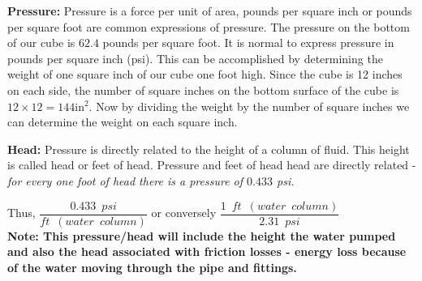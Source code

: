\textbf{Pressure:}  Pressure is a force per unit of area, pounds per square inch or pounds per square foot are common expressions of pressure. The pressure on the bottom of our cube is $62.4$ pounds per square foot. It is normal to express pressure in pounds per square inch (psi). This can be accomplished by determining the weight of one square inch of our cube one foot high. Since the cube is 12 inches on each side, the number of square inches on the bottom surface of the cube is $12 \times 12=144 \mathrm{in}^{2}$. Now by dividing the weight by the number of square inches we can determine the weight on each square inch.

\textbf{Head:}  Pressure is directly related to the height of a column of fluid. This height is called head or feet of head. Pressure and feet of head head are directly related - \emph{for every one foot of head there is a pressure of $0.433$ psi.}

\vspace{0.2cm}
Thus, $\dfrac{0.433 \enspace psi}{ft \enspace (water \enspace column)}$ or conversely $\dfrac{1 \enspace ft \enspace (water \enspace column)}{2.31 \enspace psi}$\\
\vspace{0.2cm}
\textbf{Note:  This pressure/head will include the height the water pumped and also the head associated with friction losses - energy loss because of the water moving through the pipe and fittings.}\\

\begin{figure}[h]
\end{figure}


